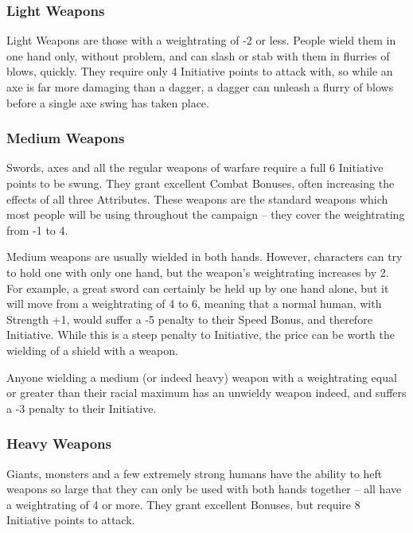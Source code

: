 \weaponschart
\label{weaponschart}

\begin{multicols}{2}

\subsubsection{Light Weapons}

Light Weapons are those with a \gls{weightrating} of -2 or less. People wield them in one hand only, without problem, and can slash or stab with them in flurries of blows, quickly. They require only 4 Initiative points to attack with, so while an axe is far more damaging than a dagger, a dagger can unleash a flurry of blows before a single axe swing has taken place.

\subsubsection{Medium Weapons}

Swords, axes and all the regular weapons of warfare require a full 6 Initiative points to be swung.
They grant excellent Combat Bonuses, often increasing the effects of all three Attributes.
These weapons are the standard weapons which most people will be using throughout the campaign -- they cover the \gls{weightrating} from -1 to 4.

Medium weapons are usually wielded in both hands.
However, characters can try to hold one with only one hand, but the weapon's \gls{weightrating} increases by 2.
For example, a great sword can certainly be held up by one hand alone, but it will move from a \gls{weightrating} of 4 to 6, meaning that a normal human, with Strength +1, would suffer a -5 penalty to their Speed Bonus, and therefore Initiative.
While this is a steep penalty to Initiative, the price can be worth the wielding of a shield with a weapon.

Anyone wielding a medium (or indeed heavy) weapon with a \gls{weightrating} equal or greater than their racial maximum has an unwieldy weapon indeed, and suffers a -3 penalty to their Initiative.

\subsubsection{Heavy Weapons}

Giants, monsters and a few extremely strong humans have the ability to heft weapons so large that they can only be used with both hands together -- all have a \gls{weightrating} of 4 or more.
They grant excellent Bonuses, but require 8 Initiative points to attack.


\end{multicols}
